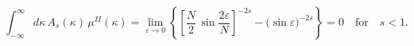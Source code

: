 \begin{equation*}
\int_{-\infty}^{\infty}d\kappa\,A_s(\kappa)\,
\mu^{II}(\kappa)=\lim_{\varepsilon \to 0}
\left\{
\left[\frac{N}{2}\,\sin
\frac{2\varepsilon}{N}
\right]^{-2s}
-\bigl(\sin\varepsilon
\bigr)^{-2s}
\right\}
=0\quad
\text{for}\quad s<1.
\end{equation*}

